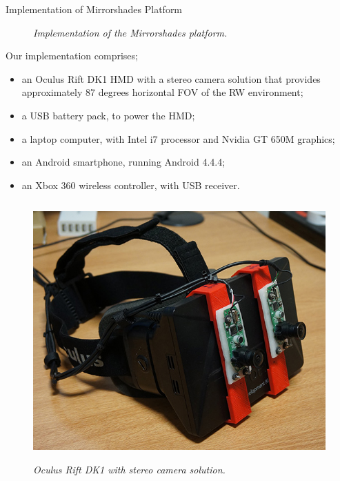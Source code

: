 \documentclass[final,t]{beamer}
\begin{document}
\begin{frame}
\begin{columns}[t]
\begin{column}{.31\linewidth}
\begin{block}{Implementation of Mirrorshades Platform}
\begin{figure}[h]
\begin{center}
					\textit{Implementation of the Mirrorshades platform.}
				\end{center}
			\end{figure}

			Our implementation comprises;
			\begin{itemize}
				\item an Oculus Rift DK1 HMD with a stereo camera solution that provides approximately 87 degrees horizontal FOV of the RW environment;
				\item a USB battery pack, to power the HMD;
				\item a laptop computer, with Intel i7 processor and Nvidia GT 650M graphics;
				\item an Android smartphone, running Android 4.4.4;
				\item an Xbox 360 wireless controller, with USB receiver.
			\end{itemize}
			
			\begin{columns}
				\begin{column}{.45\linewidth}
					\begin{figure}[h]
						\begin{center}
							\includegraphics[width=\linewidth]{images/rift.jpg}
							
							\textit{Oculus Rift DK1 with stereo camera solution.}
						\end{center}
					\end{figure}
				\end{column}
				

\end{columns}
\end{block}
\end{column}
\end{columns}
\end{frame}
\end{document}
